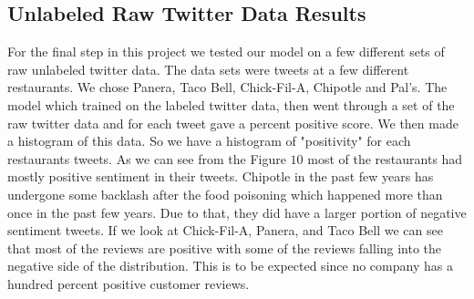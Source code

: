 \documentclass[titlepage,letterpaper]{article}
\begin{document}
\subsection{Unlabeled Raw Twitter Data Results}
For the final step in this project we tested our model on a few different sets of raw unlabeled twitter data. The data sets were tweets at a few different restaurants. We chose Panera, Taco Bell, Chick-Fil-A, Chipotle and Pal's. The model which trained on the labeled twitter data, then went through a set of the raw twitter data and for each tweet gave a percent positive score. We then made a histogram of this data. So we have a histogram of "positivity" for each restaurants tweets. As we can see from the Figure $10$ most of the restaurants had mostly positive sentiment in their tweets. Chipotle in the past few years has undergone some backlash after the food poisoning which happened more than once in the past few years. Due to that, they did have a larger portion of negative sentiment tweets. If we look at Chick-Fil-A, Panera, and Taco Bell we can see that most of the reviews are positive with some of the reviews falling into the negative side of the distribution. This is to be expected since no company has a hundred percent positive customer reviews. 


%




%

\end{document}

